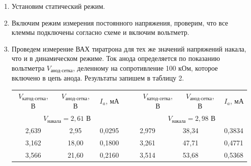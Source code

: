 	\begin{enumerate}
		\item Установим статический режим.
		
		\item Включим режим измерения постоянного напряжения, проверим, что все клеммы подключены согласно схеме и включим вольтметр.
		
		\item Проведем измерение ВАХ тиратрона для тех же значений напряжений накала, что и в динамическом режиме. Ток анода определяется по показанию вольтметра $V_\text{анод-сетка}$, деленному на сопротивление 100 кОм, которое включено в цепь анода. Результаты запишем в таблицу 2.
		
		\newpage
		\begin{table}[h!]
			\centering
			\begin{tabular}{ccccc|lll|}
				\cline{1-3} \cline{6-8}
				\multicolumn{1}{|c|}{$V_\text{катод-сетка}$, В} & \multicolumn{1}{c|}{$V_\text{анод-сетка}$, В} & \multicolumn{1}{c|}{$I_a$, мА} &  &  & \multicolumn{1}{c|}{$V_\text{катод-сетка}$, В} & \multicolumn{1}{c|}{$V_\text{анод-сетка}$, В} & \multicolumn{1}{c|}{$I_a$, мА} \\ \cline{1-3} \cline{6-8} 
				\multicolumn{3}{|c|}{$V_\text{накала} = 2,61$ В}                                                                                 &  &  & \multicolumn{3}{c|}{$V_\text{накала} = 2,98$ В}                                                                                 \\ \cline{1-3} \cline{6-8} 
				\multicolumn{1}{|c|}{2,639}                     & \multicolumn{1}{c|}{2,95}                     & \multicolumn{1}{c|}{0,0295}    &  &  & \multicolumn{1}{l|}{2,979}                     & \multicolumn{1}{l|}{38,34}                    & 0,3834                         \\ \cline{1-3} \cline{6-8} 
				\multicolumn{1}{|c|}{3,162}                     & \multicolumn{1}{c|}{18,00}                       & \multicolumn{1}{c|}{0,1800}      &  &  & \multicolumn{1}{l|}{3,261}                     & \multicolumn{1}{l|}{47,71}                    & 0,4771                         \\ \cline{1-3} \cline{6-8} 
				\multicolumn{1}{|c|}{3,566}                     & \multicolumn{1}{c|}{21,60}                     & \multicolumn{1}{c|}{0,2160}     &  &  & \multicolumn{1}{l|}{3,514}                     & \multicolumn{1}{l|}{53,68}                    & 0,5368                         \\ \cline{1-3} \cline{6-8} 

\end{tabular}
\end{table}
\end{enumerate}
